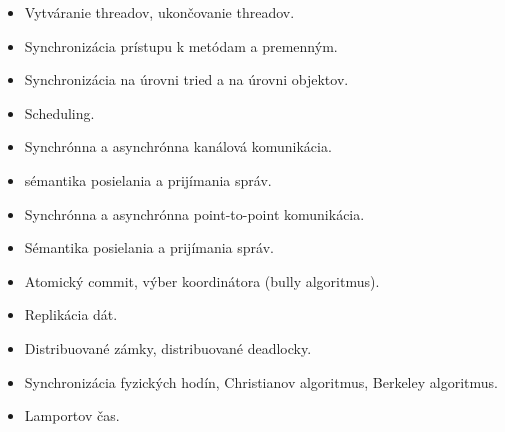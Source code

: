 \documentclass[a4paper]{report}
\begin{document}
\begin{zadanie}
\begin{itemize}
 \item Vytváranie threadov, ukončovanie threadov.
 \item Synchronizácia prístupu k metódam a premenným.
 \item Synchronizácia na úrovni tried a na úrovni objektov.
 \item Scheduling.
\end{itemize}
\end{zadanie}

\begin{zadanie}
\begin{itemize}
 \item Synchrónna a asynchrónna kanálová komunikácia.
 \item sémantika posielania a prijímania správ.
\end{itemize}
\end{zadanie}

\begin{zadanie}
\begin{itemize}
 \item Synchrónna a asynchrónna point-to-point komunikácia.
 \item Sémantika posielania a prijímania správ.
\end{itemize}
\end{zadanie}

\begin{zadanie}
\begin{itemize}
 \item Atomický commit, výber koordinátora (bully algoritmus).
\end{itemize}
\end{zadanie}

\begin{zadanie}
\begin{itemize}
 \item Replikácia dát.
 \item Distribuované zámky, distribuované deadlocky.
\end{itemize}
\end{zadanie}

\begin{zadanie}
\begin{itemize}
 \item Synchronizácia fyzických hodín, Christianov algoritmus, Berkeley algoritmus.
 \item Lamportov čas.
\end{itemize}
\end{zadanie}
\end{document}
